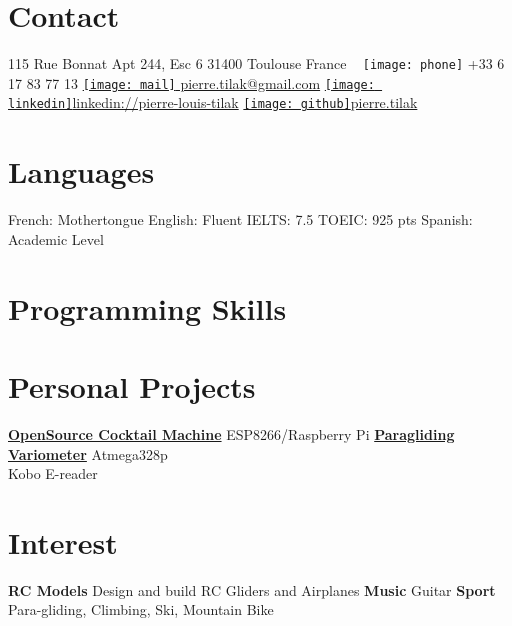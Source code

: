 \documentclass[a4paper]{friggeri-cv} %
\begin{document}


\begin{aside} %
\section{Contact}
115 Rue Bonnat
Apt 244, Esc 6
31400 Toulouse
France
~
\texttt{[image: phone]} +33 6 17 83 77 13
\href{mailto:pierre.tilak@gmail.com}{\texttt{[image: mail]} pierre.tilak@gmail.com}
\href{https://www.linkedin.com/pub/pierre-louis-tilak/96/162/a83}{\texttt{[image: linkedin]}linkedin://pierre-louis-tilak}
\href{http://tilaktilak.github.io}{\texttt{[image: github]}pierre.tilak}
\section{Languages}
French: Mothertongue
English: Fluent
IELTS: 7.5 TOEIC: 925 pts 
Spanish: Academic Level\bigskip\bigskip
\section{Programming Skills}
\bigskip\bigskip
\section{Personal Projects}
\href{https://github.com/tilaktilak/Inebriator}{\textbf{OpenSource Cocktail Machine}}
ESP8266/Raspberry Pi\bigskip
\href{https://github.com/tilaktilak/xcvario}{\textbf{Paragliding Variometer}}
Atmega328p\\ Kobo E-reader\bigskip\bigskip
\section{Interest}
\textbf{RC Models} Design and build RC Gliders and Airplanes
\textbf{Music} Guitar
\textbf{Sport} Para-gliding, Climbing, Ski, Mountain Bike
\end{aside}
\end{document}

